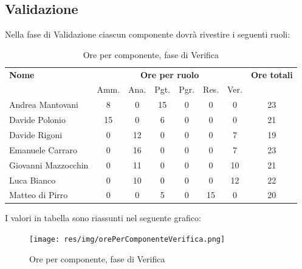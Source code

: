     
    
\pagebreak
\subsection{Validazione}
Nella fase di Validazione ciascun componente dovrà rivestire i seguenti ruoli:

\begin{table}[H]
\begin{tabular}{lccccccc}
\toprule
    \textbf{Nome}  & \multicolumn{6}{c}{\textbf{Ore per ruolo}} & \textbf{Ore totali} \\
     & Amm. & Ana. & Pgt. & Pgr. & Res. & Ver. & \\
    \midrule
    
	Andrea Mantovani & 8 & 0 & 15 & 0 & 0 & 0 & 23 \\
	Davide Polonio & 15 & 0 & 6 & 0 & 0 & 0 & 21 \\
	Davide Rigoni & 0 & 12 & 0 & 0 & 0 & 7 & 19 \\
	Emanuele Carraro & 0 & 16 & 0 & 0 & 0 & 7 & 23 \\
	Giovanni Mazzocchin & 0 & 11 & 0 & 0 & 0 & 10 & 21 \\
	Luca Bianco & 0 & 10 & 0 & 0 & 0 & 12 & 22 \\
	Matteo di Pirro & 0 & 0 & 5 & 0 & 15 & 0 & 20 \\
    
    \bottomrule
\end{tabular}
\caption{Ore per componente, fase di Verifica}
\end{table}

I valori in tabella sono riassunti nel seguente grafico: \\ 

    \begin{figure}[H]
      \begin{center}
        \texttt{[image: res/img/orePerComponenteVerifica.png]}
      \caption{Ore per componente, fase di Verifica}
      \end{center} 
    \end{figure}    
    
    
    
\pagebreak
